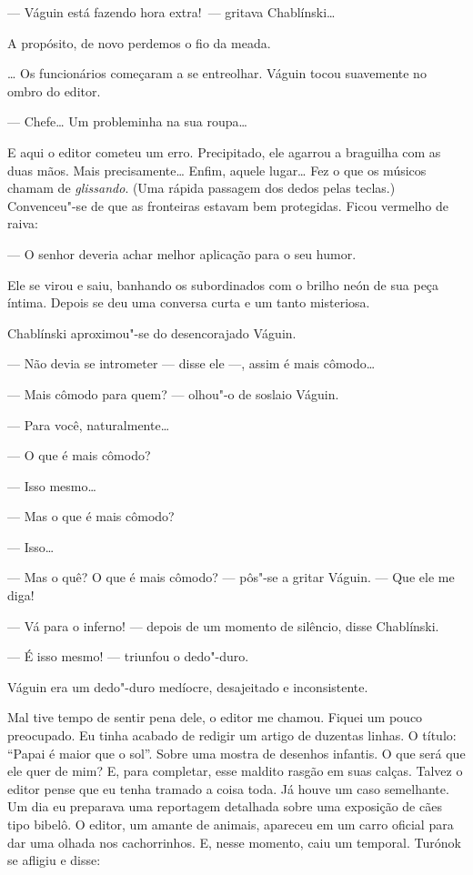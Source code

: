--- Váguin está fazendo hora extra!~--- gritava Chablínski\ldots{}

A propósito, de novo perdemos o fio da meada.

\ldots{} Os funcionários começaram a se entreolhar. Váguin tocou suavemente
no ombro do editor.

--- Chefe\ldots{} Um probleminha na sua roupa\ldots{}

E aqui o editor cometeu um erro. Precipitado, ele agarrou a braguilha
com as duas mãos. Mais precisamente\ldots{} Enfim, aquele lugar\ldots{} Fez o que
os músicos chamam de \emph{glissando}. (Uma rápida passagem dos dedos
pelas teclas.) Convenceu"-se de que as fronteiras estavam bem protegidas.
Ficou vermelho de raiva:

--- O senhor deveria achar melhor aplicação para o seu humor.

Ele se virou e saiu, banhando os subordinados com o brilho neón de sua
peça íntima. Depois se deu uma conversa curta e um tanto misteriosa.

Chablínski aproximou"-se do desencorajado Váguin.

--- Não devia se intrometer --- disse ele ---,
assim é mais cômodo\ldots{}

--- Mais cômodo para quem? --- olhou"-o de soslaio Váguin.

--- Para você, naturalmente\ldots{}

--- O que é mais cômodo?

--- Isso mesmo\ldots{}

--- Mas o que é mais cômodo?

--- Isso\ldots{}

--- Mas o quê? O que é mais cômodo? --- pôs"-se a gritar
Váguin. --- Que ele me diga!

--- Vá para o inferno! --- depois de um momento de
silêncio, disse Chablínski.

--- É isso mesmo! --- triunfou o dedo"-duro.

Váguin era um dedo"-duro medíocre, desajeitado e inconsistente.

Mal tive tempo de sentir pena dele, o editor me chamou. Fiquei um pouco
preocupado. Eu tinha acabado de redigir um artigo de duzentas linhas. O
título: ``Papai é maior que o sol''. Sobre uma mostra de desenhos
infantis. O que será que ele quer de mim? E, para completar, esse
maldito rasgão em suas calças. Talvez o editor pense que eu tenha
tramado a coisa toda. Já houve um caso semelhante. Um dia eu preparava
uma reportagem detalhada sobre uma exposição de cães tipo bibelô. O
editor, um amante de animais, apareceu em um carro oficial para dar uma
olhada nos cachorrinhos. E, nesse momento, caiu um temporal. Turónok se
afligiu e disse:


